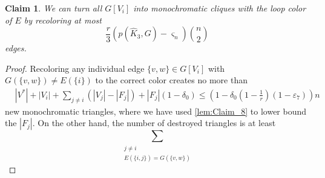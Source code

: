 \documentclass[a4paper,11pt]{article}
\newtheorem{claim}[theorem]{Claim}
\numberwithin{equation}{section}
\begin{document}
\begin{claim}\label{lem:Claim_10}
    We  can turn all $G[V_i]$ into monochromatic cliques with
    the loop color of $E$ by recoloring at most
    \begin{equation*}
        \frac{r}{3}(p(\hat K_3,G)-\varsigma_n)\binom{n}{2}
        \label{eq:Claim_10}
    \end{equation*}
    edges.
\end{claim}
\begin{proof}
    Recoloring any individual edge $\{v,w\} \in G[V_i]$ with $G(\{v,w\}) \neq E(\{i\})$ to the correct color creates no more than
    \begin{align*}
       &|V^\ast|+|V_i| + \sum_{j \neq i} (|V_j|-|F_j|) + |F_j|(1-\delta_0) \le \left(1 - \delta_0\left(1-\frac{1}{r}\right)(1-\varepsilon_7)\right)n 
    \end{align*}
    new monochromatic triangles, where we have used \cref{lem:Claim_8} to lower bound the $|F_j|$.
%
%
%
%
%
    On the other hand, the number of destroyed triangles is at least
    \[
        \sum_{\substack{j \neq i\\E(\{i,j\})=G(\{v,w\})}}
\]
\end{proof}
\end{document}
